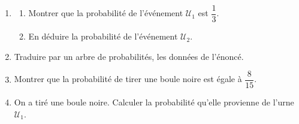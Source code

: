 \documentclass[11pt]{article}
\begin{document}
\begin{enumerate}
  \item \begin{enumerate}[label=\alph*.]
    \item Montrer que la probabilité de l'événement $\mathcal{U}_1$ est $\dfrac{1}{3}$.
    \item En déduire la probabilité de l'événement $\mathcal{U}_2$.
  \end{enumerate}
  \item Traduire par un arbre de probabilités, les données de l'énoncé.
  \item Montrer que la probabilité de tirer une boule noire est égale à $\dfrac{8}{15}$.
  \item On a tiré une boule noire. Calculer la probabilité qu'elle provienne de l'urne $\mathcal{U}_1$.
\end{enumerate}
\end{document}
